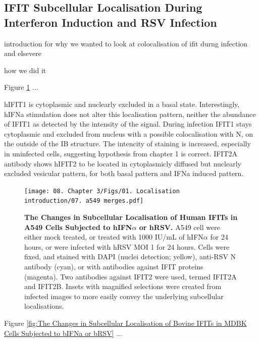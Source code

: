 \subsection{IFIT Subcellular Localisation During Interferon Induction and RSV Infection} \label{subsec:IFIT Subcellular Localisation During Interferon Induction and RSV Infection}
introduction for why we wanted to look at colocalisation of ifit durng infection and elsevere

how we did it

Figure \ref{fig:The Changes in Subcellular Localisation of Human IFITs in A549 Cells Subjected to hIFNa or hRSV} ... 

hIFIT1 is cytoplasmic and nuclearly excluded in a basal state. Interestingly, hIFNa stimulation does not alter this localisation pattern, neither the abundance of IFIT1 as detected by the intensity of the signal. During infection IFIT1 stays cytoplasmic and excluded from nucleus with a possible colocalisation with N, on the outside of the IB structure. The intencity of staining is increased, especially in uninfected cells, suggesting hypothesis from chapter 1 is correct. IFIT2A antibody shows hIFIT2 to be located in cytoplasmicly diffused but nuclearly excluded vesicular pattern, for both basal pattern and IFNa induced pattern.   

\begin{figure}
    \centering
    \texttt{[image: 08. Chapter 3/Figs/01. Localisation introduction/07. a549 merges.pdf]}
    \caption[The Changes in Subcellular Localisation of Human IFITs in A549 Cells Subjected to hIFN\(\alpha\) or hRSV.]{\textbf{The Changes in Subcellular Localisation of Human IFITs in A549 Cells Subjected to hIFN\(\alpha\) or hRSV.} A549 cell were either mock treated, or treated with 1000 IU/mL of hIFN\(\alpha\) for 24 hours, or were infected with hRSV MOI 1 for 24 hours. Cells were fixed, and stained with DAPI (nuclei detection; yellow), anti-RSV N antibody (cyan), or with antibodies against IFIT proteins (magenta). Two antibodies against IFIT2 were used, termed IFIT2A and IFIT2B. Insets with magnified selections were created from infected images to more easily convey the underlying subcellular localisations.}
    \label{fig:The Changes in Subcellular Localisation of Human IFITs in A549 Cells Subjected to hIFNa or hRSV}
\end{figure}


Figure \ref{fig:The Changes in Subcellular Localisation of Bovine IFITs in MDBK Cells Subjected to bIFNa or bRSV} ...

